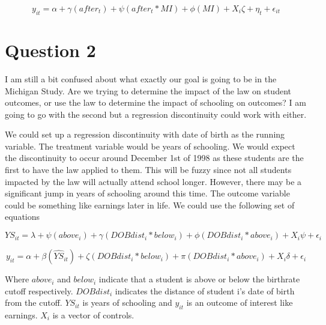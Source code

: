 \documentclass[11pt]{article}
\begin{document}
$$y_{it} = \alpha + \gamma (after_t) + \psi(after_t*MI) + \phi(MI) + X_i \zeta + \eta_t + \epsilon_{it}$$




\section{Question 2}
I am still a bit confused about what exactly our goal is going to be in the Michigan Study. Are we trying to determine the impact of the law on student outcomes, or use the law to determine the impact of schooling on outcomes? I am going to go with the second but a regression discontinuity could work with either. \par

We could set up a regression discontinuity with date of birth as the running variable. The treatment variable would be years of schooling. We would expect the discontinuity to occur around December 1st of 1998 as these students are the first to have the law applied to them. This will be fuzzy since not all students impacted by the law will actually attend school longer. However, there may be a significant jump in years of schooling around this time. The outcome variable could be something like earnings later in life. We could use the following set of equations 

$$ YS_{it} = \lambda + \psi(above_i) + \gamma(DOBdist_i*below_i) + \phi(DOBdist_i*above_i) + X_i\psi + \epsilon_i$$

$$ y_{it} = \alpha +\beta(\widehat{YS}_{it}) + \zeta(DOBdist_i*below_i) + \pi(DOBdist_i*above_i) + X_i\delta + \epsilon_i $$

Where $above_i$ and $below_i$ indicate that a student is above or below the birthrate cutoff respectively. $DOBdist_i$ indicates the distance of student i's date of birth from the cutoff. $YS_{it}$ is years of schooling and $y_{it}$ is an outcome of interest like earnings. $X_i$ is a vector of controls. 
\end{document}
